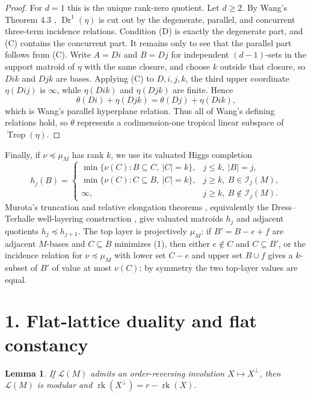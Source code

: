 \documentclass[12pt]{article}
\newcommand{\cL}{\mathcal L}
\newcommand{\Dr}{\operatorname{Dr}}
\newcommand{\Trop}{\operatorname{Trop}}
\newcommand{\rk}{\operatorname{rk}}
\newtheorem{lemma}{Lemma}
\begin{document}
\begin{proof}
For $d=1$ this is the unique rank-zero quotient.  Let $d\ge2$.  By
Wang's Theorem 4.3 \cite{Wang}, $\Dr^1(\eta)$ is cut out by the
degenerate, parallel, and concurrent three-term incidence relations.
Condition (D) is exactly the degenerate part, and (C) contains the
concurrent part.  It remains only to see that the parallel part follows
from (C).  Write $A=Di$ and $B=Dj$ for independent $(d-1)$-sets in the
support matroid of $\eta$ with the same closure, and choose $k$ outside
that closure, so $Dik$ and $Djk$ are bases.  Applying (C) to
$D,i,j,k$, the third upper coordinate $\eta(Dij)$ is $\infty$, while
$\eta(Dik)$ and $\eta(Djk)$ are finite.  Hence
\[
        \theta(Di)+\eta(Djk)=\theta(Dj)+\eta(Dik),
\]
which is Wang's parallel hyperplane relation.  Thus all of Wang's
defining relations hold, so $\theta$ represents a codimension-one
tropical linear subspace of $\Trop(\eta)$.
\end{proof}

Finally, if $\nu\preceq\mu_M$ has rank $k$, we use its valuated Higgs
completion
\[
 h_j(B)=
 \begin{cases}
 \min\{\nu(C): B\subseteq C,\ |C|=k\}, & j\le k,\ |B|=j,\\
 \min\{\nu(C): C\subseteq B,\ |C|=k\}, & j\ge k,\ B\in\mathcal I_j(M),\\
 \infty, & j\ge k,\ B\notin\mathcal I_j(M).
 \end{cases}                                                \tag{1}
\]
Murota's truncation and relative elongation theorems \cite[Theorems 2.1 and 4.1]{Murota}, equivalently the
Dress--Terhalle well-layering construction \cite{DT}, give valuated matroids
$h_j$ and adjacent quotients $h_j\preceq h_{j+1}$.  The top layer is
projectively $\mu_M$: if $B'=B-e+f$ are adjacent $M$-bases and
$C\subseteq B$ minimizes (1), then either $e\notin C$ and $C\subseteq B'$,
or the incidence relation for $\nu\preceq\mu_M$ with lower set $C-e$ and
upper set $B\cup f$ gives a $k$-subset of $B'$ of value at most
$\nu(C)$; by symmetry the two top-layer values are equal.

\section*{1. Flat-lattice duality and flat constancy}

\begin{lemma}\label{lem:modular}
If $\cL(M)$ admits an order-reversing involution $X\mapsto X^\perp$,
then $\cL(M)$ is modular and $\rk(X^\perp)=r-\rk(X)$.
\end{lemma}
\end{document}
